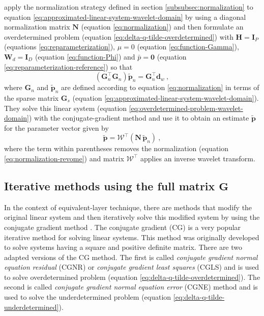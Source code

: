 \cite{li-oldenburg_2010} apply the normalization strategy defined in section \ref{subsubsec:normalization} to 
equation \ref{eq:approximated-linear-system-wavelet-domain} by using a diagonal normalization matrix $\mathbf{N}$ 
(equation \ref{eq:normalization}) and then formulate an overdetermined problem (equation \ref{eq:delta-q-tilde-overdetermined}) 
with $\mathbf{H} = \mathbf{I}_{P}$ (equations \ref{eq:reparameterization}),
$\mu = 0$ (equation \ref{eq:function-Gamma}), 
$\mathbf{W}_{d} = \mathbf{I}_{D}$ (equation \ref{eq:function-Phi}) and 
$\bar{p} = \mathbf{0}$ (equation \ref{eq:reparameterization-reference}) so that
\begin{equation}
	\left( \mathbf{G}_{n}^{\top}\mathbf{G}_{n} \right) \tilde{\mathbf{p}}_{n} 
	= \mathbf{G}_{n}^{\top}\mathbf{d}_{w} \: ,
	\label{eq:overdetermined-problem-wavelet-domain}
\end{equation}
where $\mathbf{G}_{n}$ and $\tilde{\mathbf{p}}_{n}$ are defined according to equation \ref{eq:normalization} in terms of the sparse matrix 
$\mathbf{G}_{s}$ (equation \ref{eq:approximated-linear-system-wavelet-domain}).
They solve this linear system (equation \ref{eq:overdetermined-problem-wavelet-domain}) with the conjugate-gradient method
\cite[e.g.,][sec. 11.3]{golub-vanloan2013} and use it to obtain an estimate $\tilde{\mathbf{p}}$ for the parameter vector given by
\begin{equation}
	\tilde{\mathbf{p}} = \boldsymbol{\mathcal{W}}^{\top} \left( \mathbf{N} \, \tilde{\mathbf{p}}_{n} \right) \: ,
	\label{eq:vector-p-tilde-LO10}
\end{equation}
where the term within parentheses removes the normalization (equation \ref{eq:normalization-revome}) and matrix
$\boldsymbol{\mathcal{W}}^{\top}$ applies an inverse wavelet transform. 

\subsection{Iterative methods using the full matrix $\mathbf{G}$}

In the context of equivalent-layer technique, there are methods that modify the original linear system and
then iteratively solve this modified system by using the conjugate gradient method \cite[e.g.,][]{li-oldenburg_2010, barnes-lumley_2011}.
The conjugate gradient (CG) is a very popular iterative method for solving linear systems.
This method was originally developed to solve systems having a square and positive definite matrix.
There are two adapted versions of the CG method. The first is called \textit{conjugate gradient normal equation residual} (CGNR) 
\citet[][sec. 11.3]{golub-vanloan2013} or \textit{conjugate gradient least squares} (CGLS) \cite[][p. 165]{aster_etal2019} and is
used to solve overdetermined problem (equation \ref{eq:delta-q-tilde-overdetermined}). 
The second is called \textit{conjugate gradient normal equation error} (CGNE) method 
\citet[][sec. 11.3]{golub-vanloan2013} and is used to solve the underdetermined problem (equation \ref{eq:delta-q-tilde-underdetermined}).

